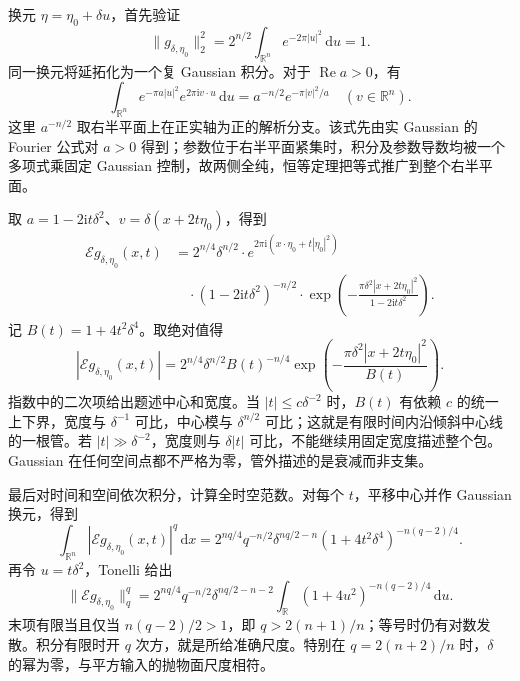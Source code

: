 \begin{solution}
换元 \(\eta=\eta_0+\delta u\)，首先验证
\[
 \|g_{\delta,\eta_0}\|_2^2
 =2^{n/2}\int_{\mathbb R^n}e^{-2\pi|u|^2}\,\mathrm du=1.
\]
同一换元将延拓化为一个复 Gaussian 积分。对于 \(\operatorname{Re}a>0\)，有
\[
 \int_{\mathbb R^n}e^{-\pi a|u|^2}e^{2\pi\mathrm i v\cdot u}\,\mathrm du
 =a^{-n/2}e^{-\pi|v|^2/a}\quad(v\in\mathbb R^n).
\]
这里 \(a^{-n/2}\) 取右半平面上在正实轴为正的解析分支。该式先由实 Gaussian 的 Fourier 公式对 \(a>0\) 得到；参数位于右半平面紧集时，积分及参数导数均被一个多项式乘固定 Gaussian 控制，故两侧全纯，恒等定理把等式推广到整个右半平面。

取 \(a=1-2\mathrm i t\delta^2\)、\(v=\delta(x+2t\eta_0)\)，得到
\[
 \begin{aligned}
 \mathcal Eg_{\delta,\eta_0}(x,t)
 &=2^{n/4}\delta^{n/2}
   \cdot e^{2\pi\mathrm i(x\cdot\eta_0+t|\eta_0|^2)}\\
 &\quad\cdot(1-2\mathrm i t\delta^2)^{-n/2}
   \cdot\exp\left(-\frac{\pi\delta^2|x+2t\eta_0|^2}
                       {1-2\mathrm i t\delta^2}\right).
 \end{aligned}
\]
记 \(B(t)=1+4t^2\delta^4\)。取绝对值得
\[
 |\mathcal Eg_{\delta,\eta_0}(x,t)|
 =2^{n/4}\delta^{n/2}B(t)^{-n/4}
       \exp\left(-\frac{\pi\delta^2|x+2t\eta_0|^2}{B(t)}\right).
\]
指数中的二次项给出题述中心和宽度。当 \(|t|\leq c\delta^{-2}\) 时，\(B(t)\) 有依赖 \(c\) 的统一上下界，宽度与 \(\delta^{-1}\) 可比，中心模与 \(\delta^{n/2}\) 可比；这就是有限时间内沿倾斜中心线的一根管。若 \(|t|\gg\delta^{-2}\)，宽度则与 \(\delta|t|\) 可比，不能继续用固定宽度描述整个包。Gaussian 在任何空间点都不严格为零，管外描述的是衰减而非支集。

最后对时间和空间依次积分，计算全时空范数。对每个 \(t\)，平移中心并作 Gaussian 换元，得到
\[
 \int_{\mathbb R^n}|\mathcal Eg_{\delta,\eta_0}(x,t)|^q\,\mathrm dx
 =2^{nq/4}q^{-n/2}\delta^{nq/2-n}
       (1+4t^2\delta^4)^{-n(q-2)/4}.
\]
再令 \(u=t\delta^2\)，Tonelli 给出
\[
 \|\mathcal Eg_{\delta,\eta_0}\|_q^q
 =2^{nq/4}q^{-n/2}\delta^{nq/2-n-2}
       \int_{\mathbb R}(1+4u^2)^{-n(q-2)/4}\,\mathrm du.
\]
末项有限当且仅当 \(n(q-2)/2>1\)，即 \(q>2(n+1)/n\)；等号时仍有对数发散。积分有限时开 \(q\) 次方，就是所给准确尺度。特别在 \(q=2(n+2)/n\) 时，\(\delta\) 的幂为零，与平方输入的抛物面尺度相符。
\end{solution}
